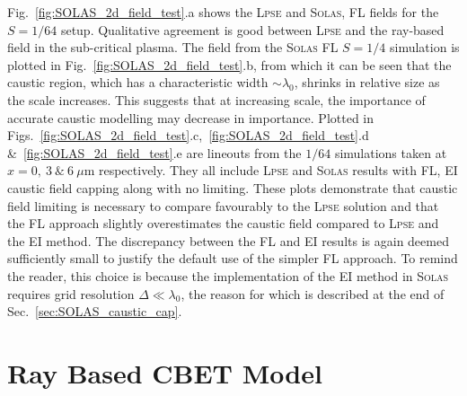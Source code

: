 Fig.~\ref{fig:SOLAS_2d_field_test}.a shows the \textsc{Lpse} and \textsc{Solas}, \ac{FL} fields for the $S=1/64$ setup.
Qualitative agreement is good between \textsc{Lpse} and the ray-based field in the sub-critical plasma.
The field from the \textsc{Solas} \ac{FL} $S=1/4$ simulation is plotted in Fig.~\ref{fig:SOLAS_2d_field_test}.b, from which it can be seen that the caustic region, which has a characteristic width $\sim\lambda_0$, shrinks in relative size as the scale increases.
This suggests that at increasing scale, the importance of accurate caustic modelling may decrease in importance.
Plotted in Figs.~\ref{fig:SOLAS_2d_field_test}.c,~\ref{fig:SOLAS_2d_field_test}.d \&~\ref{fig:SOLAS_2d_field_test}.e are lineouts from the $1/64$ simulations taken at $x=0,\ 3\ \text{\&}\ 6\ \mu\text{m}$ respectively.
They all include \textsc{Lpse} and \textsc{Solas} results with \ac{FL}, \ac{EI} caustic field capping along with no limiting.
These plots demonstrate that caustic field limiting is necessary to compare favourably to the \textsc{Lpse} solution and that the \ac{FL} approach slightly overestimates the caustic field compared to \textsc{Lpse} and the \ac{EI} method.
The discrepancy between the \ac{FL} and \ac{EI} results is again deemed sufficiently small to justify the default use of the simpler \ac{FL} approach.
To remind the reader, this choice is because the implementation of the \ac{EI} method in \textsc{Solas} requires grid resolution $\Delta\ll\lambda_0$, the reason for which is described at the end of Sec.~\ref{sec:SOLAS_caustic_cap}.

\section{Ray Based CBET Model}
\label{sec:SOLAS_cbet_model}

